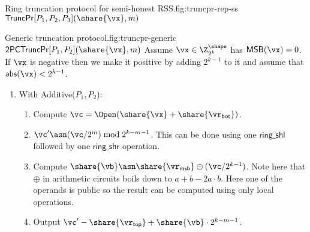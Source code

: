 \begin{Boxfig}{Ring truncation protocol for semi-honest
RSS.}{fig:truncpr-rep-ss}{$\mathsf{TruncPr}{[P_1, P_2, P_3]}(\share{\vx}, m)$}
\end{Boxfig}

\begin{Boxfig}{Generic truncation protocol.}{fig:truncpr-generic}
  {$\mathsf{2PCTruncPr}[P_1, P_2](\share{\vx}, m)$}
  Assume $\vx \in \Z_{2^k}^{\shape}$ has $\mathsf{MSB}(\vx) = 0$. If $\vx$ is negative then
  we make it positive by adding $2^{k-1}$ to it and assume that $\mathsf{abs}(\vx) < 2^{k-1}$.
  \begin{enumerate}
  \item With Additive($P_1,P_2$):
  \begin{enumerate}
    \item Compute $\vc = \Open(\share{\vx} + \share{\vr_{\mathsf{bot}}})$.
    \item $\vc' \asn (\vc/2^m) \bmod 2^{k-m-1}$. This can be done using one $\mathsf{ring\_shl}$
    followed by one $\mathsf{ring\_shr}$ operation.
    \item Compute $\share{\vb} \asn \share{\vr_{\mathsf{msb}}} \oplus (\vc / 2^{k-1})$. Note here that $\oplus$
    in arithmetic circuits boils down to $a + b - 2a\cdot b$. Here one of the operands is public so
    the result can be computed using only local operations.
    \item Output $\vc' - \share{\vr_{\mathsf{top}}} + \share{\vb} \cdot 2^{k-m-1}$.
 \end{enumerate}
\end{enumerate}

\end{Boxfig}


